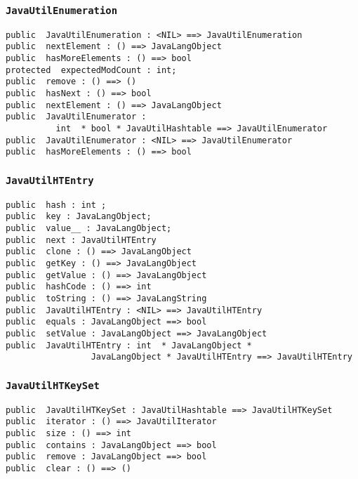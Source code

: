 \documentclass[\pformat,12pt]{article}
\begin{document}
\subsubsection{\texttt{JavaUtilEnumeration}}
\begin{small}
\begin{verbatim}
public  JavaUtilEnumeration : <NIL> ==> JavaUtilEnumeration
public  nextElement : () ==> JavaLangObject
public  hasMoreElements : () ==> bool
protected  expectedModCount : int;
public  remove : () ==> ()
public  hasNext : () ==> bool
public  nextElement : () ==> JavaLangObject
public  JavaUtilEnumerator : 
          int  * bool * JavaUtilHashtable ==> JavaUtilEnumerator
public  JavaUtilEnumerator : <NIL> ==> JavaUtilEnumerator
public  hasMoreElements : () ==> bool
\end{verbatim}
\end{small}

\subsubsection{\texttt{JavaUtilHTEntry}}
\begin{small}
\begin{verbatim}
public  hash : int ;
public  key : JavaLangObject;
public  value__ : JavaLangObject;
public  next : JavaUtilHTEntry
public  clone : () ==> JavaLangObject
public  getKey : () ==> JavaLangObject
public  getValue : () ==> JavaLangObject
public  hashCode : () ==> int
public  toString : () ==> JavaLangString
public  JavaUtilHTEntry : <NIL> ==> JavaUtilHTEntry
public  equals : JavaLangObject ==> bool
public  setValue : JavaLangObject ==> JavaLangObject
public  JavaUtilHTEntry : int  * JavaLangObject * 
                 JavaLangObject * JavaUtilHTEntry ==> JavaUtilHTEntry
\end{verbatim}
\end{small}

\subsubsection{\texttt{JavaUtilHTKeySet}}
\begin{small}
\begin{verbatim}
public  JavaUtilHTKeySet : JavaUtilHashtable ==> JavaUtilHTKeySet
public  iterator : () ==> JavaUtilIterator
public  size : () ==> int
public  contains : JavaLangObject ==> bool
public  remove : JavaLangObject ==> bool
public  clear : () ==> ()
\end{verbatim}
\end{small}
\end{document}
